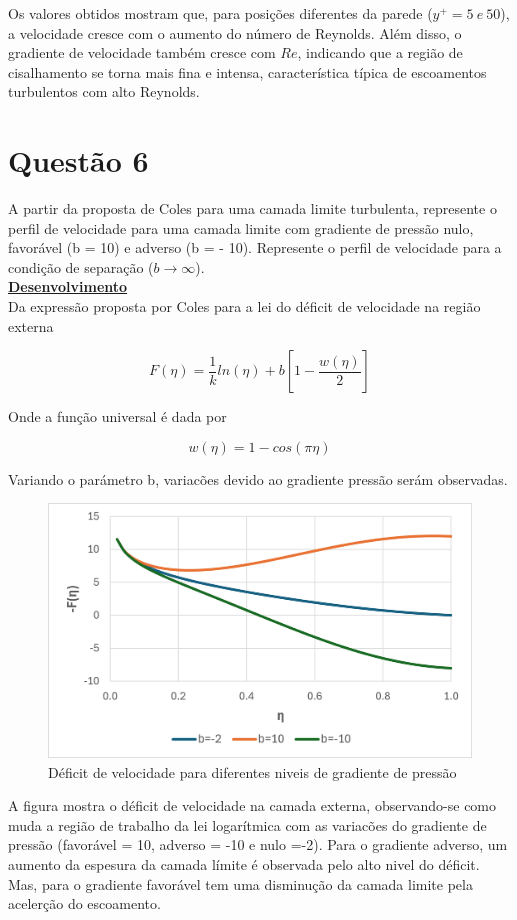 \documentclass[12pt]{article}
\begin{document}
Os valores obtidos mostram que, para posições diferentes da parede ($y^+ = 5 \ e \ 50$), a velocidade  cresce com o aumento do número de Reynolds. Além disso, o gradiente de velocidade também cresce com $Re$, indicando que a região de cisalhamento se torna mais fina e intensa, característica típica de escoamentos turbulentos com alto Reynolds.

\section*{Questão 6}
A partir da proposta de Coles para uma camada limite turbulenta, represente o perfil de
velocidade para uma camada limite com gradiente de pressão nulo, favorável (b = 10) e adverso (b = - 10). Represente o perfil de velocidade para a condição de separação ($b\rightarrow\infty$).\\


\textbf{\underline{Desenvolvimento}}\\
Da expressão proposta por Coles para a lei do déficit de velocidade na região externa

\begin{equation}
	F(\eta) = \frac{1}{k} ln(\eta) + b\left[ 1-\frac{w(\eta)}{2}\right] 
\end{equation}

Onde a função universal é dada por


\begin{equation}
	w(\eta)= 1 - cos(\pi\eta) 
\end{equation}

Variando o parámetro b, variacões devido ao gradiente pressão serám observadas.

\begin{figure}[H]
	\centering
	\includegraphics[width=.65\textwidth]{figures/3}
	\caption{Déficit de velocidade para diferentes niveis de gradiente de pressão}
\end{figure}

A figura mostra o déficit de velocidade na camada externa, observando-se como muda a região de trabalho da lei logarítmica com as variacões do gradiente de pressão (favorável = 10, adverso = -10 e nulo =-2). Para o gradiente adverso, um aumento da espesura da camada límite é observada pelo alto nivel do déficit. Mas, para o gradiente favorável tem uma disminução da camada limite pela acelerção do escoamento.
\end{document}
